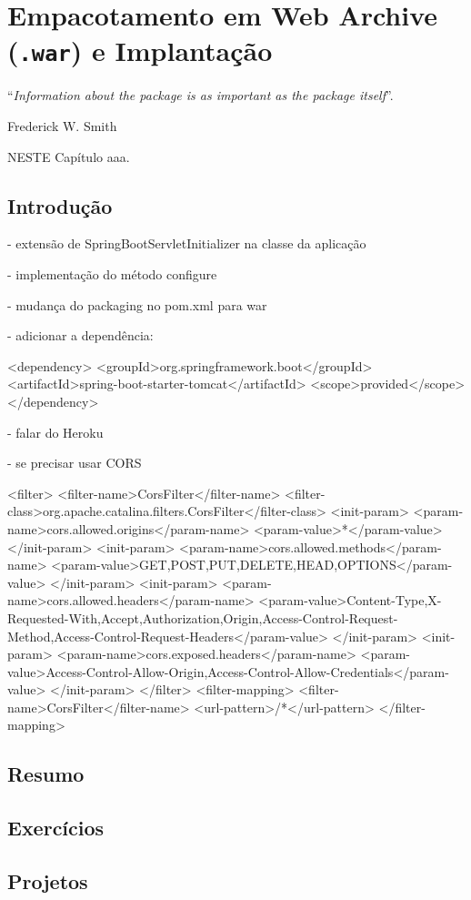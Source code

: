 \chapter{Empacotamento em Web Archive (\texttt{.war}) e Implantação}\label{cap:empacotamento}
\epigraph{``\textit{Information about the package is as important as the package itself}''.}{Frederick W. Smith}

\lettrine[lines=4, lhang=0.1, lraise=0, loversize=0.2, findent=0.1em]{\textcolor{corTema}{N}}{ESTE} Capítulo aaa.

\vfill

\section{Introdução}

- extensão de SpringBootServletInitializer na classe da aplicação

- implementação do método configure

- mudança do packaging no pom.xml para war

- adicionar a dependência:

<dependency>
    <groupId>org.springframework.boot</groupId>
    <artifactId>spring-boot-starter-tomcat</artifactId>
    <scope>provided</scope>
</dependency>

- falar do Heroku

- se precisar usar CORS

<filter>
    <filter-name>CorsFilter</filter-name>
    <filter-class>org.apache.catalina.filters.CorsFilter</filter-class>
    <init-param>
        <param-name>cors.allowed.origins</param-name>
        <param-value>*</param-value>
    </init-param>
    <init-param>
        <param-name>cors.allowed.methods</param-name>
        <param-value>GET,POST,PUT,DELETE,HEAD,OPTIONS</param-value>
    </init-param>
    <init-param>
        <param-name>cors.allowed.headers</param-name>
        <param-value>Content-Type,X-Requested-With,Accept,Authorization,Origin,Access-Control-Request-Method,Access-Control-Request-Headers</param-value>
    </init-param>
    <init-param>
        <param-name>cors.exposed.headers</param-name>
        <param-value>Access-Control-Allow-Origin,Access-Control-Allow-Credentials</param-value>
    </init-param>
</filter>
<filter-mapping>
    <filter-name>CorsFilter</filter-name>
    <url-pattern>/*</url-pattern>
</filter-mapping>

\section{Resumo}

\section{Exercícios}

\section{Projetos}
